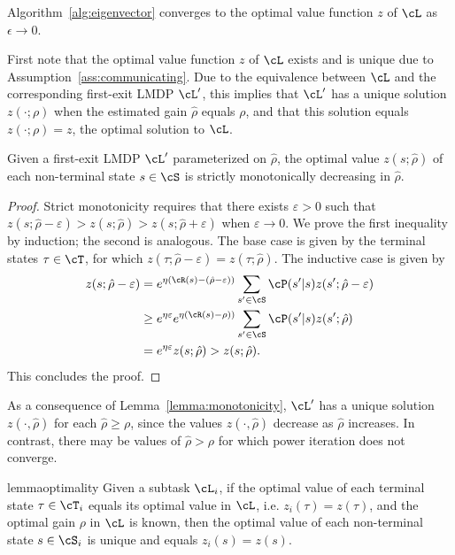 \begin{theorem}\label{thm:converge}
    Algorithm~\ref{alg:eigenvector} converges to the optimal value function $z$ of $\cL$ as $\epsilon\to 0$.
\end{theorem}

First note that the optimal value function $z$ of $\cL$ exists and is unique due to Assumption~\ref{ass:communicating}. Due to the equivalence between $\cL$ and the corresponding first-exit LMDP $\cL'$, this implies that $\cL'$ has a unique solution $z(\cdot;\rho)$ when the estimated gain $\hat\rho$ equals $\rho$, and that this solution equals $z(\cdot;\rho)=z$, the optimal solution to $\cL$.

\begin{lemma}\label{lemma:monotonicity}
     Given a first-exit LMDP $\cL'$ parameterized on $\hat\rho$, the optimal value $z(s;\hat\rho)$ of each non-terminal state $s\in\cS$ is strictly monotonically decreasing in $\hat\rho$.
\end{lemma}

\begin{proof}
Strict monotonicity requires that there exists $\varepsilon>0$ such that ${z(s;\hat\rho - \varepsilon) > z(s;\hat\rho) > z(s;\hat\rho+\varepsilon)}$ when $\varepsilon\rightarrow 0$. We prove the first inequality by induction; the second is analogous. The base case is given by the terminal states $\tau\in\cT$, for which $z(\tau;\hat\rho - \varepsilon) = z(\tau;\hat\rho)$. The inductive case is given by
\begin{align*}
    z(s;\hat\rho-\varepsilon) &= e^{\eta(\cR(s) - (\hat\rho -\varepsilon))}\sum_{s'\in\cS}\cP(s'\lvert s) z(s';\hat\rho- \varepsilon)\\
      &\geq e^{\eta\varepsilon} e^{\eta(\cR(s) - \rho))}\sum_{s'\in\cS}\cP(s'\lvert s) z(s';\hat\rho)\\
      &= e^{\eta\varepsilon} z(s;\hat\rho) > z(s;\hat\rho).
\end{align*}
This concludes the proof.
\end{proof}

As a consequence of Lemma~\ref{lemma:monotonicity}, $\cL'$ has a unique solution $z(\cdot,\hat\rho)$ for each $\hat\rho\geq\rho$, since the values $z(\cdot,\hat\rho)$ decrease as $\hat\rho$ increases. In contrast, there may be values of $\hat\rho>\rho$ for which power iteration does not converge.

\begin{restatable}{lemma}{optimality}
Given a subtask $\cL_i$, if the optimal value of each terminal state $\tau\in\cT_i$ equals its optimal value in $\cL$, i.e. $z_i(\tau) = z(\tau)$, and the optimal gain $\rho$ in $\cL$ is known, then the optimal value of each non-terminal state $s\in\cS_i$ is unique and equals $z_i(s)=z(s)$.
    \label{lemma:optimality}
\end{restatable}

